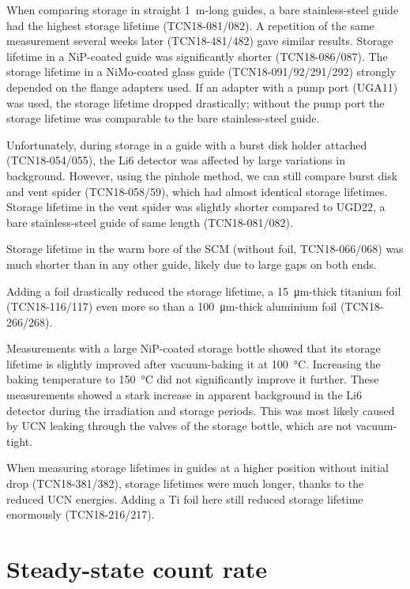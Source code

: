 \documentclass[10pt,letterpaper]{article}
\begin{document}
When comparing storage in straight \SI{1}{\meter}-long guides, a bare stainless-steel guide had the highest storage lifetime (TCN18-081/082). A repetition of the same measurement several weeks later (TCN18-481/482) gave similar results. Storage lifetime in a NiP-coated guide was significantly shorter (TCN18-086/087). The storage lifetime in a NiMo-coated glass guide (TCN18-091/92/291/292) strongly depended on the flange adapters used. If an adapter with a pump port (UGA11) was used, the storage lifetime dropped drastically; without the pump port the storage lifetime was comparable to the bare stainless-steel guide.

Unfortunately, during storage in a guide with a burst disk holder attached (TCN18-054/055), the Li6 detector was affected by large variations in background. However, using the pinhole method, we can still compare burst disk and vent spider (TCN18-058/59), which had almost identical storage lifetimes. Storage lifetime in the vent spider was slightly shorter compared to UGD22, a bare stainless-steel guide of same length (TCN18-081/082).

Storage lifetime in the warm bore of the SCM (without foil, TCN18-066/068) was much shorter than in any other guide, likely due to large gaps on both ends.

Adding a foil drastically reduced the storage lifetime, a \SI{15}{\micro\meter}-thick titanium foil (TCN18-116/117) even more so than a \SI{100}{\micro\meter}-thick aluminium foil (TCN18-266/268).

Measurements with a large NiP-coated storage bottle showed that its storage lifetime is slightly improved after vacuum-baking it at \SI{100}{\celsius}. Increasing the baking temperature to \SI{150}{\celsius} did not significantly improve it further. These measurements showed a stark increase in apparent background in the Li6 detector during the irradiation and storage periods. This was most likely caused by UCN leaking through the valves of the storage bottle, which are not vacuum-tight.

When measuring storage lifetimes in guides at a higher position without initial drop (TCN18-381/382), storage lifetimes were much longer, thanks to the reduced UCN energies. Adding a Ti foil here still reduced storage lifetime enormously (TCN18-216/217).

\section{Steady-state count rate}
\label{sec:steadystate}
\end{document}
